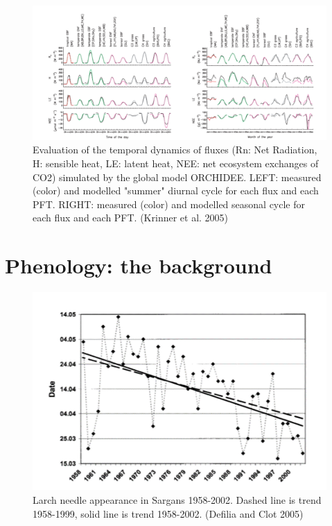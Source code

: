 \documentclass[12pt,oneside]{book}
\begin{document}
\begin{figure}

{\centering \includegraphics[width=0.8\linewidth]{figures/chap4/f41_Krinner} 

}

\caption{Evaluation of the temporal dynamics of fluxes (Rn: Net Radiation, H: sensible heat, LE: latent heat, NEE: net ecosystem exchanges of CO2) simulated by the global model ORCHIDEE. LEFT: measured (color) and modelled "summer" diurnal cycle for each flux and each PFT. RIGHT: measured (color) and modelled seasonal cycle for each flux and each PFT. (Krinner et al. 2005)}\label{fig:f41}
\end{figure}

\section{Phenology: the background}\label{phenology-the-background}

\begin{figure}

{\centering \includegraphics[width=0.8\linewidth]{figures/chap4/f42_Defilia} 

}

\caption{Larch needle appearance in Sargans 1958-2002. Dashed line is trend 1958-1999, solid line is trend 1958-2002.  (Defilia and Clot 2005)}\label{fig:f42}
\end{figure}
\end{document}
